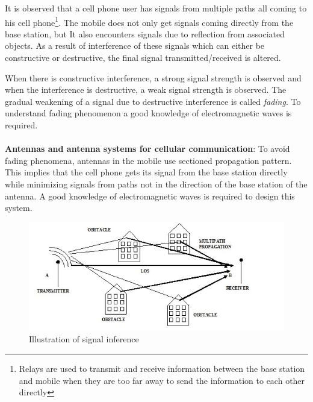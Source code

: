 It is observed that a cell phone user has signals from multiple paths all coming to his cell phone\footnote{Relays are used to transmit and receive information between the base station and mobile when they are too far away to send the information to each other directly}. The mobile does not only get signals coming directly from the base station, but It also encounters signals due to reflection from associated objects. As a result of interference of these signals which can either be constructive or destructive, the final signal transmitted/received is altered. 

When there is constructive interference, a strong signal strength is observed and when the interference is destructive, a weak signal strength is observed.
The gradual weakening of a signal due to destructive interference is called \textit{fading}. To understand fading phenomenon a good knowledge of electromagnetic waves is required.\\\\

\textbf{Antennas and antenna systems for cellular communication}: To avoid fading phenomena, antennas in the mobile use sectioned propagation pattern. This implies that the cell phone gets its signal from the base station directly while minimizing signals from paths not in the direction of the base station of the antenna. A good knowledge of electromagnetic waves is required to design this system.
\begin{figure}[h]
\centering
\includegraphics[scale=0.4]{./graphics/rod}
\caption{Illustration of signal inference}
\end{figure}
